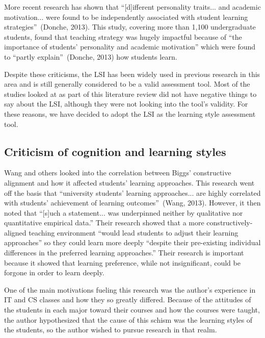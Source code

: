 More recent research has shown that ``[d]ifferent personality traits... and academic motivation... were found to be independently associated with student learning strategies''~(Donche, 2013). This study, covering more than 1,100 undergraduate students, found that teaching strategy was hugely impactful because of ``the importance of students' personality and academic motivation'' which were found to ``partly explain''~(Donche, 2013) how students learn.

Despite these criticisms, the LSI has been widely used in previous research in this area and is still generally considered to be a valid assessment tool. Most of the studies looked at as part of this literature review did not have negative things to say about the LSI, although they were not looking into the tool's validity. For these reasons, we have decided to adopt the LSI as the learning style assessment tool.

\subsection{Criticism of cognition and learning styles}
Wang and others looked into the correlation between Biggs' constructive alignment and how it affected students' learning approaches. This research went off the basis that ``university students' learning approaches... are highly correlated with students' achievement of learning outcomes''~(Wang, 2013). However, it then noted that ``[s]uch a statement... was underpinned neither by qualitative nor quantitative empirical data.'' Their research showed that a more constructively-aligned teaching environment ``would lead students to adjust their learning approaches'' so they could learn more deeply ``despite their pre-existing individual differences
in the preferred learning approaches.'' Their research is important because it showed that learning preference, while not insignificant, could be forgone in order to learn deeply.

One of the main motivations fueling this research was the author's experience in IT and CS classes and how they so greatly differed. Because of the attitudes of the students in each major toward their courses and how the courses were taught, the author hypothesized that the cause of this schism was the learning styles of the students, so the author wished to pursue research in that realm.


